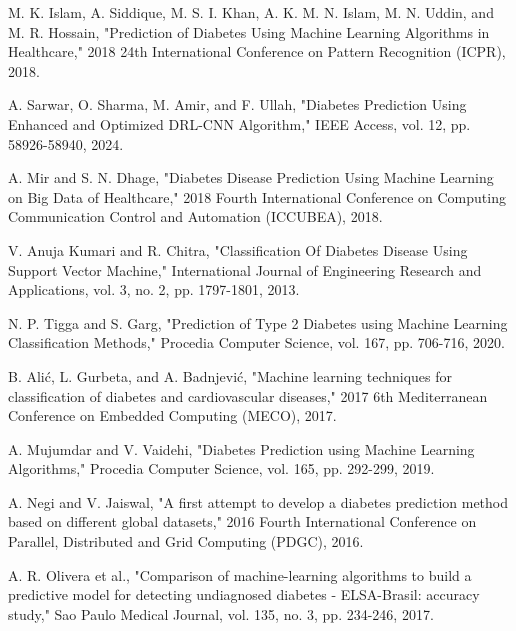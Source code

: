 \documentclass[journal]{IEEEtran}
\begin{document}
\begin{thebibliography}{00}
 M. K. Islam, A. Siddique, M. S. I. Khan, A. K. M. N. Islam, M. N. Uddin, and M. R. Hossain, "Prediction of Diabetes Using Machine Learning Algorithms in Healthcare," 2018 24th International Conference on Pattern Recognition (ICPR), 2018.

 A. Sarwar, O. Sharma, M. Amir, and F. Ullah, "Diabetes Prediction Using Enhanced and Optimized DRL-CNN Algorithm," IEEE Access, vol. 12, pp. 58926-58940, 2024.

 A. Mir and S. N. Dhage, "Diabetes Disease Prediction Using Machine Learning on Big Data of Healthcare," 2018 Fourth International Conference on Computing Communication Control and Automation (ICCUBEA), 2018.

 V. Anuja Kumari and R. Chitra, "Classification Of Diabetes Disease Using Support Vector Machine," International Journal of Engineering Research and Applications, vol. 3, no. 2, pp. 1797-1801, 2013.

 N. P. Tigga and S. Garg, "Prediction of Type 2 Diabetes using Machine Learning Classification Methods," Procedia Computer Science, vol. 167, pp. 706-716, 2020.

 B. Alić, L. Gurbeta, and A. Badnjević, "Machine learning techniques for classification of diabetes and cardiovascular diseases," 2017 6th Mediterranean Conference on Embedded Computing (MECO), 2017.

 A. Mujumdar and V. Vaidehi, "Diabetes Prediction using Machine Learning Algorithms," Procedia Computer Science, vol. 165, pp. 292-299, 2019.

 A. Negi and V. Jaiswal, "A first attempt to develop a diabetes prediction method based on different global datasets," 2016 Fourth International Conference on Parallel, Distributed and Grid Computing (PDGC), 2016.

 A. R. Olivera et al., "Comparison of machine-learning algorithms to build a predictive model for detecting undiagnosed diabetes - ELSA-Brasil: accuracy study," Sao Paulo Medical Journal, vol. 135, no. 3, pp. 234-246, 2017.

\end{thebibliography}
\end{document}
